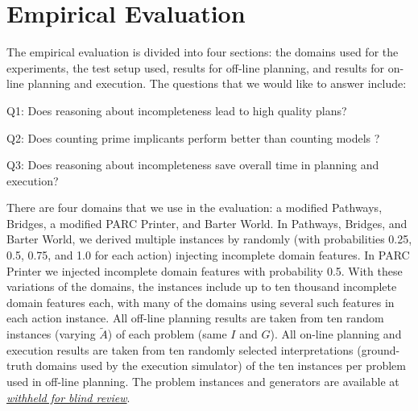 \documentclass{article}
\def\und#1{\noindent{\bf #1}:}
\newenvironment{packed_itemize}{
\begin{itemize}
  \setlength{\itemsep}{1pt}
  \setlength{\parskip}{0pt}
  \setlength{\parsep}{0pt}
}{\end{itemize}}
\def\und#1{\medskip{\noindent\bf #1:}}
\begin{document}
\section{Empirical Evaluation}\label{sec:empirical}
%
The empirical evaluation is divided into four sections:  the domains used for the experiments, the test setup used, results for off-line planning, and results for on-line planning and execution.  The questions that we would like to answer include: 
\begin{packed_itemize}
\item Q1: Does reasoning about incompleteness lead to high quality plans?
\item Q2: Does counting prime implicants perform better than counting models ?
\item Q3: Does reasoning about incompleteness save overall time in planning and execution?
\end{packed_itemize}







\und{Domains} There are four domains that we use in the evaluation: a modified Pathways, Bridges,  a modified PARC Printer, and Barter World.  In Pathways, Bridges, and Barter World, we derived multiple instances by randomly (with probabilities 0.25, 0.5, 0.75, and 1.0 for each action) injecting incomplete domain features.   In PARC Printer we injected incomplete domain features with probability 0.5. With these variations of the domains, the instances include up to ten thousand incomplete domain features each, with many of the domains using several such features in each action instance. All off-line planning results are taken from ten random instances (varying $\tilde{A}$) of each problem (same $I$ and $G$).  All on-line planning and execution results are taken from ten randomly selected interpretations (ground-truth domains used by the execution simulator) of the ten instances per problem used in off-line planning.
The problem instances and generators are available at \href{}{\it withheld for blind review}.
\end{document}
